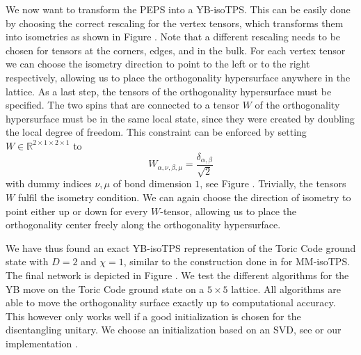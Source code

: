 We now want to transform the PEPS into a YB-isoTPS. This can be easily done by choosing the correct rescaling for the vertex tensors, which transforms them into isometries as shown in Figure . Note that a different rescaling needs to be chosen for tensors at the corners, edges, and in the bulk. For each vertex tensor we can choose the isometry direction to point to the left or to the right respectively, allowing us to place the orthogonality hypersurface anywhere in the lattice. As a last step, the tensors of the orthogonality hypersurface must be specified. The two spins that are connected to a tensor $W$ of the orthogonality hypersurface must be in the same local state, since they were created by doubling the local degree of freedom. This constraint can be enforced by setting $W\in\mathbb{R}^{2\times1\times2\times1}$ to
\begin{equation}
	W_{\alpha,\nu,\beta,\mu} = \frac{\delta_{\alpha,\beta}}{\sqrt{2}}
\end{equation} 
with dummy indices $\nu, \mu$ of bond dimension $1$, see Figure . Trivially, the tensors $W$ fulfil the isometry condition. We can again choose the direction of isometry to point either up or down for every $W$-tensor, allowing us to place the orthogonality center freely along the orthogonality hypersurface.\par
We have thus found an exact YB-isoTPS representation of the Toric Code ground state with $D = 2$ and $\chi= 1$, similar to the construction done in \cite{cite:isometric_tensor_network_representation_of_string_net_liquids} for MM-isoTPS. The final network is depicted in Figure . We test the different algorithms for the YB move on the Toric Code ground state on a $5\times5$ lattice. All algorithms are able to move the orthogonality surface exactly up to computational accuracy. This however only works well if a good initialization is chosen for the disentangling unitary. We choose an initialization based on an SVD, see \cite{cite:isometric_tensor_network_states_in_two_dimensions, cite:efficient_simulation_of_dynamics_in_two_dimensional_quantum_spin_systems} or our implementation \cite{cite:github_YB_isoTPS}.